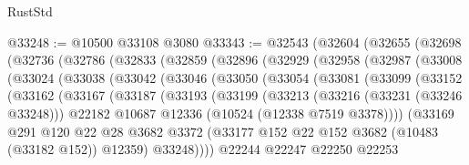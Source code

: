 \begin{lexlean}{RustStd}
\begin{coremodule}
@33248 := @10500 @33108 @3080
@33343 := @32543
    (@32604
      (@32655
        (@32698
          (@32736
            (@32786
              (@32833
                (@32859
                  (@32896
                    (@32929
                      (@32958
                        (@32987
                          (@33008
                            (@33024
                              (@33038
                                (@33042
                                  (@33046
                                    (@33050
                                      (@33054
                                        (@33081
                                          (@33099
                                            (@33152
                                              (@33162
                                                (@33167
                                                  (@33187
                                                    (@33193
                                                      (@33199
                                                        (@33213
                                                          (@33216 (@33231 (@33246 @33248)))
                                                          @22182
                                                          @10687
                                                          @12336
                                                          (@10524 (@12338 @7519 @3378))))
                                                      (@33169
                                                        @291
                                                        @120
                                                        @22
                                                        @28
                                                        @3682
                                                        @3372
                                                        (@33177
                                                          @152
                                                          @22
                                                          @152
                                                          @3682
                                                          (@10483 (@33182 @152))
                                                          @12359)
                                                        @33248))))
                                                @22244
                                                @22247
                                                @22250
                                                @22253

\end{coremodule}
\end{lexlean}
